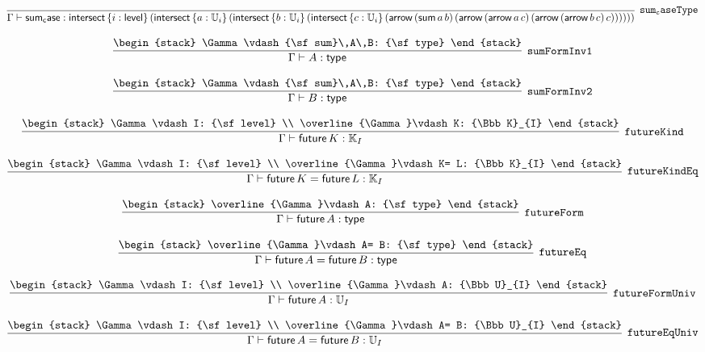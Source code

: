\[
\infer[{\tt sum_caseType}]{\Gamma \vdash {\sf sum_case}: {\sf intersect}\,\{i : {\sf level}\}\,({\sf intersect}\,\{a : {\Bbb U}_{i}\}\,({\sf intersect}\,\{b : {\Bbb U}_{i}\}\,({\sf intersect}\,\{c : {\Bbb U}_{i}\}\,({\sf arrow}\,({\sf sum}\,a\,b)\,({\sf arrow}\,({\sf arrow}\,a\,c)\,({\sf arrow}\,({\sf arrow}\,b\,c)\,c))))))}{}
\]

\[
\infer[{\tt sumFormInv1}]{\Gamma \vdash A: {\sf type}}{
\begin{stack}
\Gamma \vdash {\sf sum}\,A\,B: {\sf type}
\end{stack}}
\]

\[
\infer[{\tt sumFormInv2}]{\Gamma \vdash B: {\sf type}}{
\begin{stack}
\Gamma \vdash {\sf sum}\,A\,B: {\sf type}
\end{stack}}
\]

\[
\infer[{\tt futureKind}]{\Gamma \vdash {\sf future}\,K: {\Bbb K}_{I}}{
\begin{stack}
\Gamma \vdash I: {\sf level}
\\
\overline{\Gamma}\vdash K: {\Bbb K}_{I}
\end{stack}}
\]

\[
\infer[{\tt futureKindEq}]{\Gamma \vdash {\sf future}\,K= {\sf future}\,L: {\Bbb K}_{I}}{
\begin{stack}
\Gamma \vdash I: {\sf level}
\\
\overline{\Gamma}\vdash K= L: {\Bbb K}_{I}
\end{stack}}
\]

\[
\infer[{\tt futureForm}]{\Gamma \vdash {\sf future}\,A: {\sf type}}{
\begin{stack}
\overline{\Gamma}\vdash A: {\sf type}
\end{stack}}
\]

\[
\infer[{\tt futureEq}]{\Gamma \vdash {\sf future}\,A= {\sf future}\,B: {\sf type}}{
\begin{stack}
\overline{\Gamma}\vdash A= B: {\sf type}
\end{stack}}
\]

\[
\infer[{\tt futureFormUniv}]{\Gamma \vdash {\sf future}\,A: {\Bbb U}_{I}}{
\begin{stack}
\Gamma \vdash I: {\sf level}
\\
\overline{\Gamma}\vdash A: {\Bbb U}_{I}
\end{stack}}
\]

\[
\infer[{\tt futureEqUniv}]{\Gamma \vdash {\sf future}\,A= {\sf future}\,B: {\Bbb U}_{I}}{
\begin{stack}
\Gamma \vdash I: {\sf level}
\\
\overline{\Gamma}\vdash A= B: {\Bbb U}_{I}
\end{stack}}
\]

